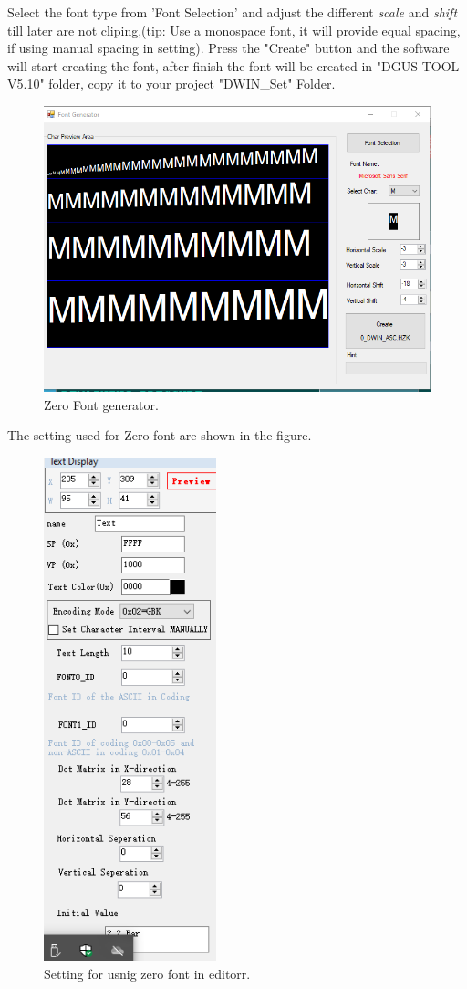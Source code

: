 \documentclass[12pt, A4]{article} %
\begin{document}
Select the font type from 'Font Selection' and adjust the different \emph{scale} and \emph{shift} till later are not cliping,(tip: Use a monospace font, it will provide equal spacing, if using manual spacing in setting). Press the "Create" button and the software will start creating the font, after finish the font will be created in "DGUS TOOL V5.10" folder, copy it to your project "DWIN\_Set" Folder.
\begin{figure}[!htb] %
	\centering
	\includegraphics[width=12cm]{zero-font} 
	\caption{Zero Font generator.\\}
\end{figure}
The setting used for Zero font are shown in the figure.
\begin{figure}[!htb] %
	\centering
	\includegraphics[width=5cm]{zero-font-config}
	\caption{Setting for usnig zero font in editorr.\\}
\end{figure}
\end{document}
